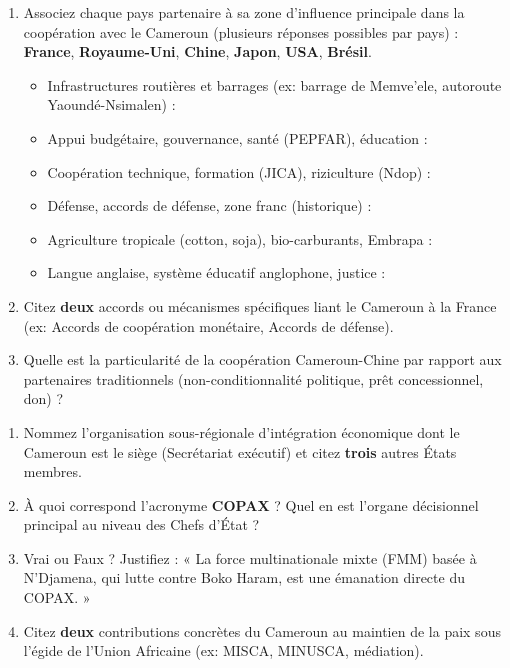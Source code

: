 \documentclass[11pt]{article}
\begin{document}
\begin{exercice}
\begin{enumerate}
    \item Associez chaque pays partenaire à sa zone d'influence principale dans la coopération avec le Cameroun (plusieurs réponses possibles par pays) : \textbf{France}, \textbf{Royaume-Uni}, \textbf{Chine}, \textbf{Japon}, \textbf{USA}, \textbf{Brésil}.
    \begin{itemize}
        \item Infrastructures routières et barrages (ex: barrage de Memve'ele, autoroute Yaoundé-Nsimalen) :
        \item Appui budgétaire, gouvernance, santé (PEPFAR), éducation :
        \item Coopération technique, formation (JICA), riziculture (Ndop) :
        \item Défense, accords de défense, zone franc (historique) :
        \item Agriculture tropicale (cotton, soja), bio-carburants, Embrapa :
        \item Langue anglaise, système éducatif anglophone, justice :
    \end{itemize}
    \item Citez \textbf{deux} accords ou mécanismes spécifiques liant le Cameroun à la France (ex: Accords de coopération monétaire, Accords de défense).
    \item Quelle est la particularité de la coopération Cameroun-Chine par rapport aux partenaires traditionnels (non-conditionnalité politique, prêt concessionnel, don) ?
\end{enumerate}
\end{exercice}

\begin{exercice}
\begin{enumerate}
    \item Nommez l'organisation sous-régionale d'intégration économique dont le Cameroun est le siège (Secrétariat exécutif) et citez \textbf{trois} autres États membres.
    \item À quoi correspond l'acronyme \textbf{COPAX} ? Quel en est l'organe décisionnel principal au niveau des Chefs d'État ?
    \item Vrai ou Faux ? Justifiez : « La force multinationale mixte (FMM) basée à N'Djamena, qui lutte contre Boko Haram, est une émanation directe du COPAX. »
    \item Citez \textbf{deux} contributions concrètes du Cameroun au maintien de la paix sous l'égide de l'Union Africaine (ex: MISCA, MINUSCA, médiation).
\end{enumerate}
\end{exercice}
\end{document}
